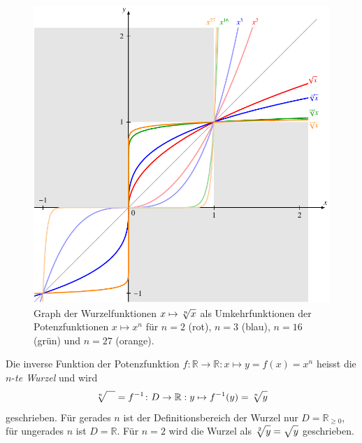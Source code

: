 \begin{figure}
\centering
\includegraphics{chapters/010-potenzen/images/wurzel.pdf}
\caption[Graph der Wurzelfunktionen]{Graph der Wurzelfunktionen
\ensuremath{x\mapsto\root{n}\of{x}}
als Umkehrfunktionen der Potenzfunktionen $x\mapsto x^n$ für
$n=2$ ({\color{red}rot}), $n=3$ ({\color{blue}blau}),
$n=16$ ({\color{darkgreen}grün}) und $n=27$ ({\color{orange}orange}).
\label{buch:potenzen:fig:wurzel}
}
\end{figure}

\begin{definition}
Die inverse Funktion der Potenzfunktion
$f\colon \mathbb{R}\to\mathbb{R}:x\mapsto y=f(x)=x^n$
heisst die $n$-{\em te Wurzel} und wird
\[
\root{n}\of{\mathstrut\phantom{m}}
=
f^{-1}
\colon
D\to\mathbb{R}
:
y\mapsto f^{-1}(y)=\root{n}\of{\mathstrut y}
\]
geschrieben.
Für gerades $n$ ist der Definitionsbereich der Wurzel nur
$D=\mathbb{R}_{\ge 0}$, für ungerades $n$ ist $D=\mathbb{R}$.
Für $n=2$ wird die Wurzel als
\(
\root{2}\of{\mathstrut y}
=
\sqrt{\mathstrut y}
\)
geschrieben.
\end{definition}

